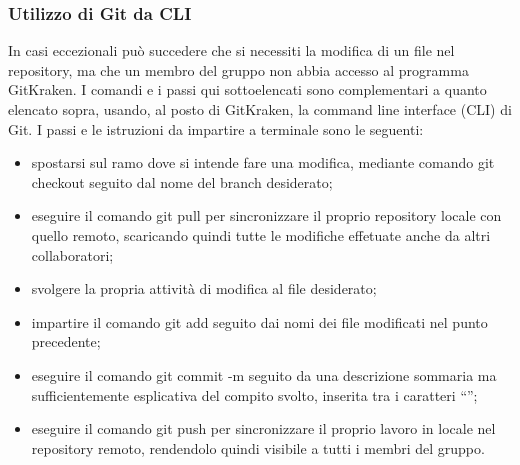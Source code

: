\subsubsection{Utilizzo di Git da CLI}
In casi eccezionali può succedere che si necessiti la modifica di un file nel repository, ma che un membro del gruppo {\Gruppo} non abbia accesso al programma GitKraken. I comandi e i passi qui sottoelencati sono complementari a quanto elencato sopra, usando, al posto di GitKraken, la command line interface (CLI) di Git. I passi e le istruzioni da impartire a terminale sono le seguenti:
\begin{itemize}
	\item spostarsi sul ramo dove si intende fare una modifica, mediante comando git checkout seguito dal nome del branch desiderato;
	\item eseguire il comando git pull per sincronizzare il proprio repository locale con quello remoto, scaricando quindi tutte le modifiche effetuate anche da altri collaboratori;
	\item svolgere la propria attività di modifica al file desiderato;
	\item impartire il comando git add seguito dai nomi dei file modificati nel punto precedente;
	\item eseguire il comando git commit -m seguito da una descrizione sommaria ma sufficientemente esplicativa del compito svolto, inserita tra i caratteri “”;
	\item eseguire il comando git push per sincronizzare il proprio lavoro in locale nel repository remoto, rendendolo quindi visibile a tutti i membri del gruppo.
\end{itemize}


